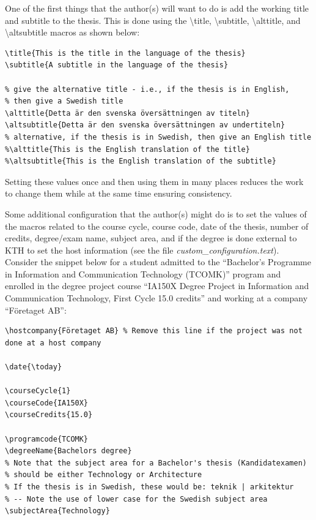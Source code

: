 \documentclass[main.tex]{subfiles}
\begin{document}
One of the first things that the author(s) will want to do is add the working title and subtitle to the thesis. This is done using the \textbackslash title, \textbackslash subtitle, \textbackslash alttitle, and \textbackslash altsubtitle macros as shown below:
\begin{lstlisting}[style=latexExampleForAuthors]
\title{This is the title in the language of the thesis}
\subtitle{A subtitle in the language of the thesis}

% give the alternative title - i.e., if the thesis is in English,
% then give a Swedish title
\alttitle{Detta är den svenska översättningen av titeln}
\altsubtitle{Detta är den svenska översättningen av undertiteln}
% alternative, if the thesis is in Swedish, then give an English title
%\alttitle{This is the English translation of the title}
%\altsubtitle{This is the English translation of the subtitle}
\end{lstlisting}

Setting these values once and then using them in many places reduces the work to change them while at the same time ensuring consistency.

Some additional configuration that the author(s) might do is to set the values of the macros related to the course cycle, course code, date of the thesis, number of credits, degree/exam name, subject area, and if the degree is done external to KTH to set the host information (see the file \textit{custom\_configuration.text}). Consider the snippet below for a student admitted to the ``Bachelor's Programme in Information and Communication Technology (TCOMK)'' program and enrolled in the degree project course ``IA150X Degree Project in Information and Communication Technology, First Cycle 15.0 credits'' and working at a company ``Företaget AB'':
\begin{lstlisting}[style=latexExampleForAuthors]
\hostcompany{Företaget AB} % Remove this line if the project was not done at a host company

\date{\today}

\courseCycle{1}
\courseCode{IA150X}
\courseCredits{15.0}

\programcode{TCOMK}
\degreeName{Bachelors degree}
% Note that the subject area for a Bachelor's thesis (Kandidatexamen)
% should be either Technology or Architecture
% If the thesis is in Swedish, these would be: teknik | arkitektur
% -- Note the use of lower case for the Swedish subject area
\subjectArea{Technology}
\end{lstlisting}
\end{document}
